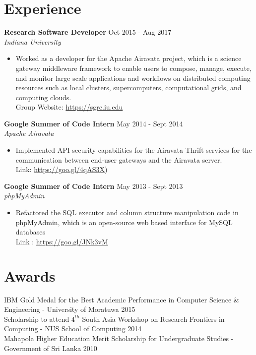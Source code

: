 \documentclass[margin]{res}
\begin{document}
\begin{resume}
\section{Experience}
\textbf{Research Software Developer}
\hfill Oct 2015 - Aug 2017 \\
\textit{Indiana University} \\
\begin{itemize}[leftmargin=-.in]
\vspace{-3mm}
\item Worked as a developer for the Apache Airavata project, which is a science gateway middleware framework to enable users to compose, manage, execute, and monitor large scale applications and workflows on distributed computing resources such as local clusters, supercomputers, computational grids, and computing clouds.\\
Group Website: \url{https://sgrc.iu.edu}
\end{itemize}

\textbf{Google Summer of Code Intern}
\hfill May 2014 - Sept 2014 \\
\textit{Apache Airavata} \\
\begin{itemize}[leftmargin=-.in]
\vspace{-3mm}
\item Implemented API security capabilities for the Airavata Thrift services for the communication between end-user gateways and the Airavata server. \\
Link: \url{https://goo.gl/4qAS3X})
\end{itemize}

\textbf{Google Summer of Code Intern}
\hfill May 2013 - Sept 2013 \\
\textit{phpMyAdmin} \\
\begin{itemize}[leftmargin=-.in]
\vspace{-3mm}
\item Refactored the SQL executor and column structure manipulation code in phpMyAdmin, which is an open-source web based interface for MySQL databases\\
Link : \url{https://goo.gl/JNk3vM}
\end{itemize}


\section{Awards}
IBM Gold Medal for the Best Academic Performance in Computer Science \& Engineering - University of Moratuwa \hfill 2015
\vspace{2mm}
\\
Scholarship to attend $4^{th}$ South Asia Workshop on Research Frontiers in Computing - NUS School of Computing \hfill 2014
\vspace{2mm}
\\
Mahapola Higher Education Merit Scholarship for Undergraduate Studies - Government of Sri Lanka \hfill 2010
\vspace{2mm}


\end{resume}
\end{document}
